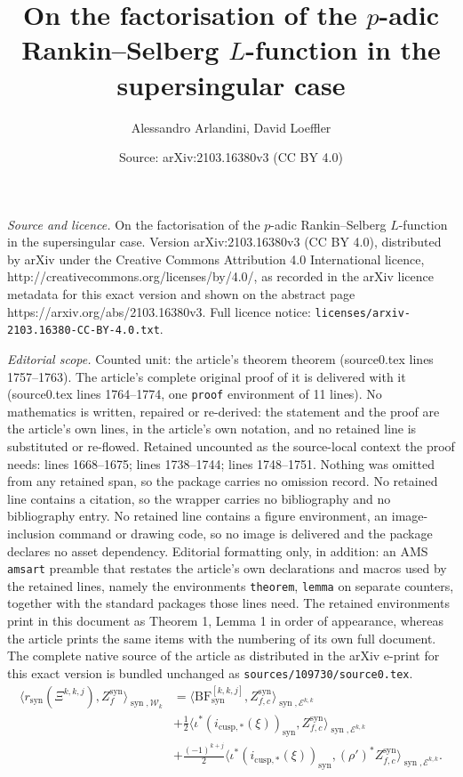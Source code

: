 \documentclass[10pt,a4paper]{amsart}
\title{On the factorisation of the \texorpdfstring{$p$}{p}-adic Rankin--Selberg \texorpdfstring{$L$}{L}-function in the supersingular case}
\author{Alessandro Arlandini, David Loeffler}
\date{Source: arXiv:2103.16380v3 (CC BY 4.0)}
\newcommand{\BF}{\mathrm{BF}}
\newcommand{\Ell}{\mathcal{E}}
\newcommand{\KS}{\mathscr{W}}
\newcommand{\cBF}{\Xi}
\newcommand{\regulator}[1]{r_{#1}}
\newcommand{\rsyn}{\regulator{\syn}}
\DeclareMathOperator{\syn}{syn}
\begin{document}
\maketitle

\noindent\emph{Source and licence.} On the factorisation of the \texorpdfstring{$p$}{p}-adic Rankin--Selberg \texorpdfstring{$L$}{L}-function in the supersingular case. Version arXiv:2103.16380v3 (CC BY 4.0), distributed by arXiv under the Creative Commons Attribution 4.0 International licence, http://creativecommons.org/licenses/by/4.0/, as recorded in the arXiv licence metadata for this exact version and shown on the abstract page https://arxiv.org/abs/2103.16380v3. Full licence notice: \texttt{licenses/arxiv-2103.16380-CC-BY-4.0.txt}.\par\smallskip

\noindent\textit{Editorial scope.} Counted unit: the article's theorem theorem (source0.tex lines 1757--1763). The article's complete original proof of it is delivered with it (source0.tex lines 1764--1774, one \texttt{proof} environment of 11 lines). No mathematics is written, repaired or re-derived: the statement and the proof are the article's own lines, in the article's own notation, and no retained line is substituted or re-flowed.  Retained uncounted as the source-local context the proof needs: lines 1668--1675; lines 1738--1744; lines 1748--1751.  Nothing was omitted from any retained span, so the package carries no omission record.  No retained line contains a citation, so the wrapper carries no bibliography and no bibliography entry.  No retained line contains a figure environment, an image-inclusion command or drawing code, so no image is delivered and the package declares no asset dependency.  Editorial formatting only, in addition: an AMS \texttt{amsart} preamble that restates the article's own declarations and macros used by the retained lines, namely the environments \texttt{theorem}, \texttt{lemma} on separate counters, together with the standard packages those lines need.  The retained environments print in this document as Theorem 1, Lemma 1 in order of appearance, whereas the article prints the same items with the numbering of its own full document.  The complete native source of the article as distributed in the arXiv e-print for this exact version is bundled unchanged as \texttt{sources/109730/source0.tex}.
\begin{equation}
    \label{eq:pairing-in-two}
    \begin{split}
        \langle \rsyn(\cBF^{k,k,j}),Z_f^{\syn} \rangle_{\syn, \KS_k} &= \langle \BF^{[k,k,j]}_{\syn}, Z_{f,c}^{\syn} \rangle_{\syn,\Ell^{k, k}} \\
        &+ \frac{1}{2}\langle \iota^*(i_{\mathrm{cusp},*}(\xi))_{\syn}, Z_{f,c}^{\syn} \rangle_{\syn,\Ell^{k, k}} \\
        &+ \frac{(-1)^{k+j}}{2}\langle \iota^*(i_{\mathrm{cusp},*}(\xi))_{\syn}, (\rho')^* Z_{f,c}^{\syn} \rangle_{\syn,\Ell^{k, k}}.
    \end{split}
\end{equation}
\end{document}
